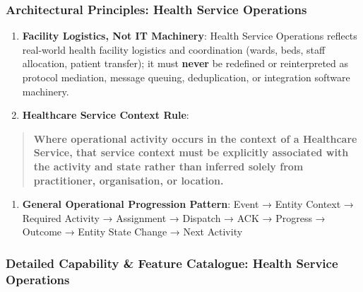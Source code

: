 \subsubsection*{Architectural Principles: Health Service Operations}
\label{rad:enabling:471}

\begin{enumerate}

\item 
\textbf{Facility Logistics, Not IT Machinery}: Health Service Operations reflects real-world health facility logistics and coordination (wards, beds, staff allocation, patient transfer); it must \textbf{never} be redefined or reinterpreted as protocol mediation, message queuing, deduplication, or integration software machinery.



\item 
\textbf{Healthcare Service Context Rule}:



\end{enumerate}
\label{rad:enabling:473}

\begin{quote}

\textbf{Where operational activity occurs in the context of a Healthcare Service, that service context must be explicitly associated with the activity and state rather than inferred solely from practitioner, organisation, or location.}


\end{quote}
\label{rad:enabling:474}

\begin{enumerate}

\item 
\textbf{General Operational Progression Pattern}: Event → Entity Context → Required Activity → Assignment → Dispatch → ACK → Progress → Outcome → Entity State Change → Next Activity



\end{enumerate}
\label{rad:enabling:477}

\par\smallskip
{}\label{rad:enabling:479}
\subsubsection*{Detailed Capability \& Feature Catalogue: Health Service Operations}
\label{rad:enabling:481}
